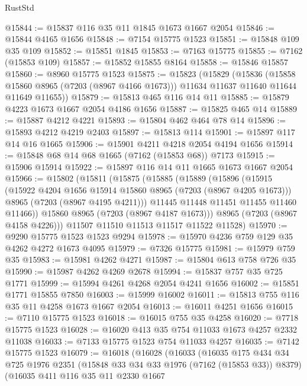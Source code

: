 \begin{lexlean}{RustStd}
\begin{coremodule}
@15844 := @15837 @116 @35 @11 @1845 @1673 @1667 @2054
@15846 := @15844 @4165 @1656
@15848 := @7154 @15775 @1523
@15851 := @15848 @109 @35 @109
@15852 := @15851 @1845
@15853 := @7163 @15775
@15855 := @7162 (@15853 @109)
@15857 := @15852 @15855 @8164
@15858 := @15846 @15857
@15860 := @8960 @15775 @1523
@15875 := @15823
    (@15829
      (@15836
        (@15858 @15860 @8965 (@7203 (@8967 @4166 @1673)))
        @11634
        @11637
        @11640
        @11644
        @11649
        @11655))
@15879 := @15813 @465 @116 @14 @11
@15885 := @15879 @4223 @1673 @1667 @2054 @4186 @1656
@15887 := @15825 @465 @14
@15889 := @15887 @4212 @4221
@15893 := @15804 @462 @464 @78 @14
@15896 := @15893 @4212 @4219 @2403
@15897 := @15813 @114
@15901 := @15897 @117 @14 @16 @1665
@15906 := @15901 @4211 @4218 @2054 @4194 @1656
@15914 := @15848 @68 @14 @68 @1665 (@7162 (@15853 @68)) @7173
@15915 := @15906 @15914
@15922 := @15897 @116 @14 @11 @1665 @1673 @1667 @2054
@15966 := @15802
    (@15811
      (@15875
        (@15885
          (@15889
            (@15896
              (@15915
                (@15922 @4204 @1656 @15914 @15860 @8965 (@7203 (@8967 @4205 @1673)))
                @8965
                (@7203 (@8967 @4195 @4211)))
              @11445
              @11448
              @11451
              @11455
              @11460
              @11466))
          @15860
          @8965
          (@7203 (@8967 @4187 @1673)))
        @8965
        (@7203 (@8967 @4158 @4226)))
      @11507
      @11510
      @11513
      @11517
      @11522
      @11528)
@15970 := @9290 @15775 @1523 @1523 @9294
@15978 := @15970 @4236 @759 @129 @35 @4262 @4272 @1673 @4095
@15979 := @7326 @15775
@15981 := @15979 @759 @35
@15983 := @15981 @4262 @4271
@15987 := @15804 @613 @758 @726 @35
@15990 := @15987 @4262 @4269 @2678
@15994 := @15837 @757 @35 @725 @1771
@15999 := @15994 @4261 @4268 @2054 @4241 @1656
@16002 := @15851 @1771 @15855 @7850
@16003 := @15999 @16002
@16011 := @15813 @755 @116 @35 @11 @4258 @1673 @1667 @2054
@16013 := @16011 @4251 @1656
@16015 := @7110 @15775 @1523
@16018 := @16015 @755 @35 @4258
@16020 := @7718 @15775 @1523
@16028 := @16020 @413 @35 @754 @11033 @1673 @4257 @2332 @11038
@16033 := @7133 @15775 @1523 @754 @11033 @4257
@16035 := @7142 @15775 @1523
@16079 := @16018
    (@16028
      (@16033
        (@16035
          @175
          @434
          @34
          @725
          @1976
          @2351
          (@15848 @33 @34 @33 @1976 (@7162 (@15853 @33)) @8379)
          (@16035
            @411
            @116
            @35
            @11
            @2330
            @1667

\end{coremodule}
\end{lexlean}
